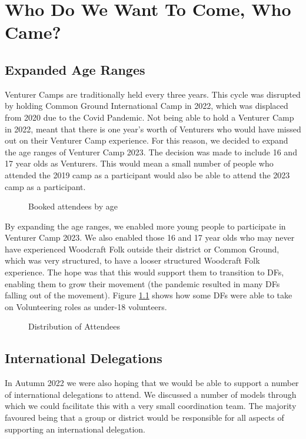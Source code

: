 \chapter{Who Do We Want To Come, Who Came?}

\section{Expanded Age Ranges}
Venturer Camps are traditionally held every three years. This cycle was disrupted by holding Common Ground International Camp in 2022, which was displaced from 2020 due to the Covid Pandemic. Not being able to hold a Venturer Camp in 2022, meant that there is one year's worth of Venturers who would have missed out on their Venturer Camp experience. For this reason, we decided to expand the age ranges of Venturer Camp 2023. The decision was made to include 16 and 17 year olds as Venturers. This would mean a small number of people who attended the 2019 camp as a participant would also be able to attend the 2023 camp as a participant.
\begin{figure}[h]
    \centering
    \caption{Booked attendees by age}
\end{figure}

By expanding the age ranges, we enabled more young people to participate in Venturer Camp 2023. We also enabled those 16 and 17 year olds who may never have experienced Woodcraft Folk outside their district or Common Ground, which was very structured, to have a looser structured Woodcraft Folk experience. The hope was that this would support them to transition to DFs, enabling them to grow their movement (the pandemic resulted in many DFs falling out of the movement). Figure \ref{fig:distribution-of-attendees} shows how some DFs were able to take on Volunteering roles as under-18 volunteers.
\begin{figure}[ht]
    \centering
    \label{fig:distribution-of-attendees}
    \caption{Distribution of Attendees}
\end{figure}

\section{International Delegations}
In Autumn 2022 we were also hoping that we would be able to support a number of international delegations to attend. We discussed a number of models through which we could facilitate this with a very small coordination team. The majority favoured being that a group or district would be responsible for all aspects of supporting an international delegation.\\

